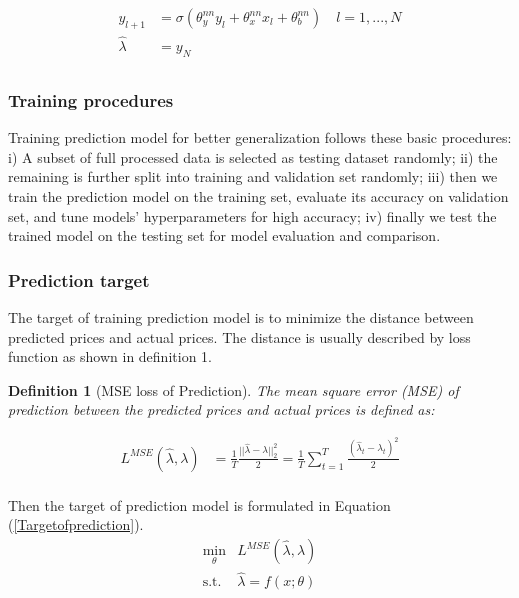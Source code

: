 \documentclass[journal]{IEEEtran}
\newtheorem{definition}{Definition}
\begin{document}
\begin{equation}
  \label{ResNet}
  \begin{aligned}
     y_{l+1} &= \sigma (\theta_y^{nn} y_l + \theta_x^{nn} x_l + \theta_b^{nn}) \quad l = 1, ..., N \\
     \hat{\lambda} &= y_{N} \\
  \end{aligned}
\end{equation}

\subsubsection{Training procedures}
Training prediction model for better generalization follows these basic procedures: i) A subset of full processed data is selected as testing dataset randomly; ii) the remaining is further split into training and validation set randomly; iii) then we train the prediction model on the training set, evaluate its accuracy on validation set, and tune models' hyperparameters for high accuracy; iv) finally we test the trained model on the testing set for model evaluation and comparison. 

\subsubsection{Prediction target}
The target of training prediction model is to minimize the distance between predicted prices and actual prices. The distance is usually described by loss function as shown in definition 1.

\begin{definition}[MSE loss of Prediction]
  The mean square error (MSE) of prediction between the predicted prices and actual prices is defined as:  
\end{definition}
\begin{equation}
  \label{MSE}
  \begin{aligned}
    L^{MSE}(\hat{\lambda}, \lambda) &= \frac{1}{T} \frac{||\hat{\lambda} - \lambda ||^2_2}{2}  = \frac{1}{T} \sum_{t=1}^T \frac{(\hat{\lambda}_t - \lambda_t)^2}{2} \\
  \end{aligned}
\end{equation}

Then the target of prediction model is formulated in Equation (\ref{Targetofprediction}).
\begin{equation}
  \label{Targetofprediction}
  \begin{aligned}
    \min_{\theta} &L^{MSE}(\hat{\lambda}, \lambda) \\
    \text{s.t. } &\hat{\lambda} = f(x; \theta) \\
  \end{aligned}
\end{equation}
\end{document}

